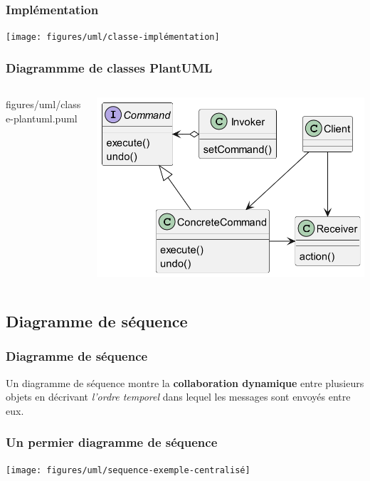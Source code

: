 \begin{frame}
    \frametitle{Implémentation}
    \centering
    \texttt{[image: figures/uml/classe-implémentation]}
\end{frame}

\begin{frame}
    \frametitle{Diagrammme de classes PlantUML}
    \begin{columns}
        \begin{column}{0.4\textwidth}
            
            {figures/uml/classe-plantuml.puml}
        \end{column}
        \begin{column}{0.6\textwidth}
            \centering
            \includegraphics[width=0.8\linewidth]{figures/uml/classe-plantuml}
        \end{column}
    \end{columns}
\end{frame}

\subsection{Diagramme de séquence}
\label{subsec:diagramme-sequence}

\begin{frame}
    \frametitle{Diagramme de séquence}
    Un diagramme de séquence montre la \textbf{collaboration dynamique} entre plusieurs objets
    en décrivant \emph{l’ordre temporel} dans lequel les messages sont envoyés entre eux.
\end{frame}

\begin{frame}
    \frametitle{Un permier diagramme de séquence}
    \centering
    \texttt{[image: figures/uml/sequence-exemple-centralisé]}
\end{frame}

